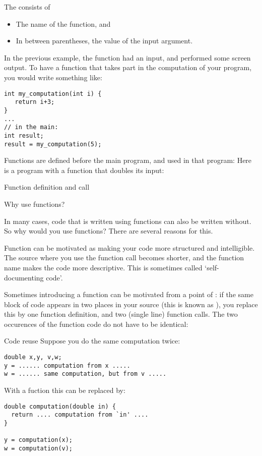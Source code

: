 The  consists of
\begin{itemize}
\item The name of the function, and
\item In between parentheses, the value of the input argument.
\end{itemize}

In the previous example, the function had an input, and performed some
screen output. To have a function that takes part in the computation
of your program, you would write something like:
\begin{lstlisting}
int my_computation(int i) {
   return i+3;
}
...
// in the main:
int result;
result = my_computation(5);
\end{lstlisting}

Functions are defined before the main program, and used in that program:
Here is a program with a function that doubles its input:

\begin{block}{Function definition and call}
  \label{sl:fun-example}
\end{block}

 {Why use functions?}

In many cases, code that is written using functions can also be
written without. So why would you use functions? There are several
reasons for this.

Function can be motivated as making your code more structured and intelligible.
The source where you use the function call becomes shorter,
and the function
name makes the code more descriptive. This is sometimes called
`self-documenting code'.

Sometimes introducing a function can be motivated from a point of
: if the same block of code appears in two
places in your source (this is known as
), you replace this by one function
definition, and two (single line) function calls.  The two occurences
of the function code do not have to be identical:


\begin{block}{Code reuse}
  \label{sl:reuse}
Suppose you do the same computation twice:
\begin{lstlisting}
double x,y, v,w;
y = ...... computation from x .....
w = ...... same computation, but from v .....
\end{lstlisting}
With a fuction this can be replaced by:
\begin{lstlisting}
double computation(double in) {
  return .... computation from `in' ....
}

y = computation(x);
w = computation(v);
\end{lstlisting}
\end{block}

